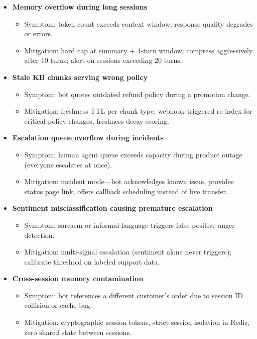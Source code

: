 \begin{itemize}
  \item \textbf{Memory overflow during long sessions}
  \begin{itemize}
    \item Symptom: token count exceeds context window; response quality degrades or errors.
    \item Mitigation: hard cap at summary + 4-turn window; compress aggressively after 10 turns; alert on sessions exceeding 20 turns.
  \end{itemize}

  \item \textbf{Stale KB chunks serving wrong policy}
  \begin{itemize}
    \item Symptom: bot quotes outdated refund policy during a promotion change.
    \item Mitigation: freshness TTL per chunk type, webhook-triggered re-index for critical policy changes, freshness decay scoring.
  \end{itemize}

  \item \textbf{Escalation queue overflow during incidents}
  \begin{itemize}
    \item Symptom: human agent queue exceeds capacity during product outage (everyone escalates at once).
    \item Mitigation: incident mode---bot acknowledges known issue, provides status page link, offers callback scheduling instead of live transfer.
  \end{itemize}

  \item \textbf{Sentiment misclassification causing premature escalation}
  \begin{itemize}
    \item Symptom: sarcasm or informal language triggers false-positive anger detection.
    \item Mitigation: multi-signal escalation (sentiment alone never triggers); calibrate threshold on labeled support data.
  \end{itemize}

  \item \textbf{Cross-session memory contamination}
  \begin{itemize}
    \item Symptom: bot references a different customer's order due to session ID collision or cache bug.
    \item Mitigation: cryptographic session tokens, strict session isolation in Redis, zero shared state between sessions.
  \end{itemize}


\end{itemize}
